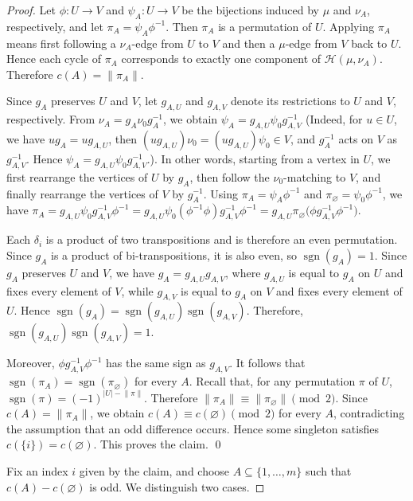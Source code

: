 \documentclass[12pt]{article}
\theoremstyle{definition}
\begin{document}
\begin{proof}
Let $\phi:U\to V$ and $\psi_A:U\to V$ be the bijections induced by
$\mu$ and $\nu_A$, respectively, and let
$\pi_A=\psi_A\phi^{-1}$. Then $\pi_A$ is a permutation of $U$.
Applying $\pi_A$ means first following a $\nu_A$-edge from $U$ to
$V$ and then a $\mu$-edge from $V$ back to $U$. Hence each cycle of
$\pi_A$ corresponds to exactly one component of
$\mathcal H(\mu,\nu_A)$. Therefore
$c(A)=\lVert\pi_A\rVert$.

Since $g_A$ preserves $U$ and $V$, let $g_{A,U}$ and $g_{A,V}$ denote
its restrictions to $U$ and $V$, respectively. From
$\nu_A=g_A\nu_0g_A^{-1}$, we obtain
$\psi_A=g_{A,U}\psi_0g_{A,V}^{-1}$ (Indeed, for \(u\in U\), we have \(ug_A=ug_{A,U}\), then \((ug_{A,U})\nu_0=(ug_{A,U})\psi_0\in V\), and \(g_A^{-1}\) acts on \(V\) as \(g_{A,V}^{-1}\). Hence \(\psi_A=g_{A,U}\psi_0g_{A,V}^{-1}\).). In other words, starting from a vertex in $U$, we first rearrange the vertices of $U$ by $g_A$, then follow the $\nu_0$-matching to $V$, and finally rearrange the vertices of $V$ by $g_A^{-1}$.   Using $\pi_A=\psi_A\phi^{-1}$ and
$\pi_\varnothing=\psi_0\phi^{-1}$, we have
$\pi_A=g_{A,U}\psi_0g_{A,V}^{-1}\phi^{-1}
=g_{A,U}\psi_0(\phi^{-1}\phi)g_{A,V}^{-1}\phi^{-1}
=g_{A,U}\pi_\varnothing
\bigl(\phi g_{A,V}^{-1}\phi^{-1}\bigr)$.

Each $\delta_i$ is a product of two transpositions and is therefore an even permutation. Since $g_A$ is a product of bi-transpositions, it is also even, so $\operatorname{sgn}(g_A)=1$. Since $g_A$ preserves $U$ and $V$, we have $g_A=g_{A,U}g_{A,V}$, where $g_{A,U}$ is equal to $g_A$ on $U$ and fixes every element of $V$, while $g_{A,V}$ is equal to $g_A$ on $V$ and fixes every element of $U$. Hence
$\operatorname{sgn}(g_A)=\operatorname{sgn}(g_{A,U})\operatorname{sgn}(g_{A,V})$.
Therefore,
$\operatorname{sgn}(g_{A,U})\operatorname{sgn}(g_{A,V})=1$.


Moreover, $\phi g_{A,V}^{-1}\phi^{-1}$ has the same sign as
$g_{A,V}$. It follows that
$\operatorname{sgn}(\pi_A)=\operatorname{sgn}(\pi_\varnothing)$
for every $A$. Recall that, for any permutation $\pi$ of $U$,
$\operatorname{sgn}(\pi)=(-1)^{|U|-\lVert\pi\rVert}$.
Therefore
$\lVert\pi_A\rVert\equiv\lVert\pi_\varnothing\rVert\pmod 2$.
Since $c(A)=\lVert\pi_A\rVert$, we obtain
$c(A)\equiv c(\varnothing)\pmod 2$ for every $A$, contradicting the
assumption that an odd difference occurs. Hence some singleton
satisfies $c(\{i\})=c(\varnothing)$. This proves the claim. \qed

\medskip
Fix an index $i$ given by the claim, and choose
$A\subseteq\{1,\ldots,m\}$ such that
$c(A)-c(\varnothing)$ is odd. We distinguish two cases.


\end{proof}
\end{document}
